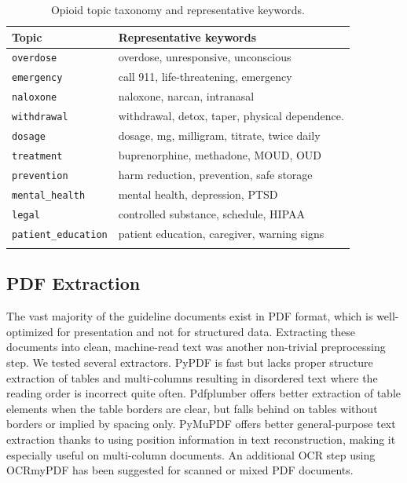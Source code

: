 \documentclass[pdflatex,sn-mathphys-num]{sn-jnl}
\theoremstyle{thmstyleone}
\theoremstyle{thmstyletwo}
\theoremstyle{thmstylethree}
\begin{document}
\begin{table}[h]
    \centering
    \caption{Opioid topic taxonomy and representative keywords.}
    \label{tab:topics}
    \begin{tabular}{@{}ll@{}}
        \toprule
        \textbf{Topic} & \textbf{Representative keywords} \\
        \midrule
        \texttt{overdose}           & overdose, unresponsive, unconscious \\
        \texttt{emergency}          & call 911, life-threatening, emergency \\
        \texttt{naloxone}           & naloxone, narcan, intranasal \\
        \texttt{withdrawal}         & withdrawal, detox, taper, physical dependence. \\
        \texttt{dosage}             & dosage, mg, milligram, titrate, twice daily \\
        \texttt{treatment}          & buprenorphine, methadone, MOUD, OUD \\
        \texttt{prevention}         & harm reduction, prevention, safe storage \\
        \texttt{mental\_health}     & mental health, depression, PTSD \\
        \texttt{legal}              & controlled substance, schedule, HIPAA \\
        \texttt{patient\_education} & patient education, caregiver, warning signs \\
        \botrule
    \end{tabular}
\end{table}

\subsection{PDF Extraction}\label{sec:pdf_extraction}

The vast majority of the guideline documents exist in PDF format, which is well-optimized for presentation and not for structured data. Extracting these documents into clean, machine-read text was another non-trivial preprocessing step. We tested several extractors. PyPDF is fast but lacks proper structure extraction of tables and multi-columns resulting in disordered text where the reading order is incorrect quite often. Pdfplumber offers better extraction of table elements when the table borders are clear, but
falls behind on tables without borders or implied by spacing only. PyMuPDF offers better general-purpose text extraction thanks to using position information in text reconstruction, making it especially useful on multi-column documents. An additional OCR step using OCRmyPDF has been suggested for scanned or mixed PDF documents.
\end{document}
